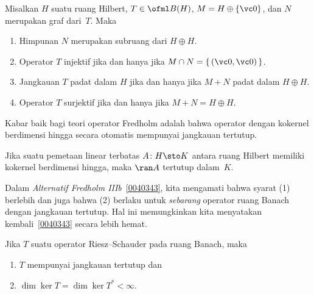 \begin{prop} Misalkan $H$ suatu ruang Hilbert, $T \in \ofml B(H)$, $M = H \oplus \{\vc 0\}$, dan $N$
merupakan graf dari~$T$. Maka
 \begin{enumerate}
   \item[(a)] Himpunan $N$ merupakan subruang dari $H \oplus H$.
   \item[(b)] Operator $T$ injektif jika dan hanya jika $M \cap N = \{\,(\vc 0,\vc 0)\,\}$.
   \item[(c)] Jangkauan $T$ padat dalam $H$ jika dan hanya jika $M + N$ padat dalam $H \oplus H$.
   \item[(d)] Operator $T$ surjektif jika dan hanya jika $M + N = H \oplus H$.
 \end{enumerate}
\end{prop}

Kabar baik bagi teori operator Fredholm adalah bahwa operator dengan kokernel
berdimensi hingga secara otomatis mempunyai jangkauan tertutup.

\begin{prop}\label{00411} Jika suatu pemetaan linear terbatas $A\colon H \sto K$ antara ruang Hilbert
memiliki kokernel berdimensi hingga, maka $\ran A$ tertutup dalam~$K$.
\end{prop}

Dalam \emph{Alternatif Fredholm IIIb}~\ref{0040343}, kita mengamati bahwa syarat (1)
berlebih dan juga bahwa (2) berlaku untuk \emph{sebarang} operator ruang Banach dengan jangkauan tertutup.
Hal ini memungkinkan kita menyatakan kembali~\ref{0040343} secara lebih hemat.

\begin{prop}\label{00413}
Jika $T$ suatu operator Riesz--Schauder pada ruang Banach, maka
 \begin{enumerate}
    \item $T$ mempunyai jangkauan tertutup dan
    \item  $\dim\ker T = \dim \ker T^* < \infty$.
 \end{enumerate}
\end{prop}













 
